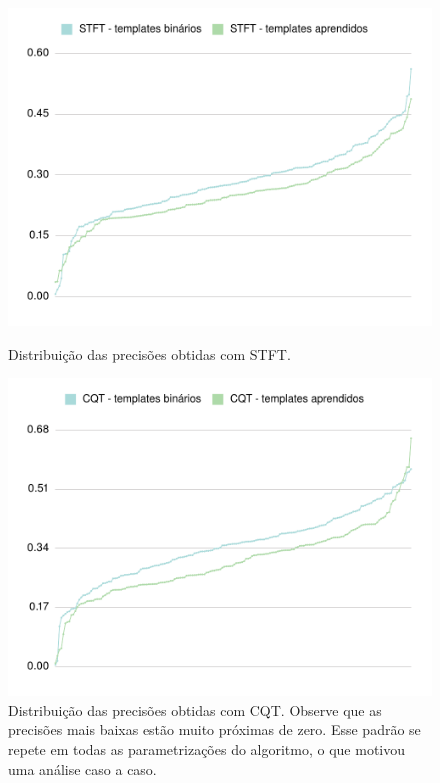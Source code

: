     \begin{figure}[htb]
        \begin{center}
            \includegraphics[width=13cm]{figuras/05-distribuicoes-stft-bin-aprendidos.png}
            \caption{\label{fig:exp:dist:stft}Distribuição das precisões obtidas com STFT.}
            
            \includegraphics[width=13cm]{figuras/05-distribuicoes-cqt-bin-aprendidos.png}
            \caption{\label{fig:exp:dist:cqt}Distribuição das precisões obtidas com CQT. Observe que as precisões mais baixas estão muito próximas de zero. Esse padrão se repete em todas as parametrizações do algoritmo, o que motivou uma análise caso a caso.}
        \end{center}
    \end{figure}

